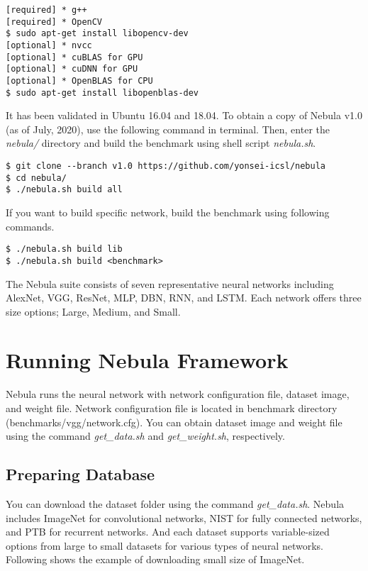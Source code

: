 \documentclass[10pt]{article}
\begin{document}
\begin{Verbatim}[frame=single,fontsize=\small]
[required] * g++
[required] * OpenCV
$ sudo apt-get install libopencv-dev
[optional] * nvcc
[optional] * cuBLAS for GPU 
[optional] * cuDNN for GPU
[optional] * OpenBLAS for CPU
$ sudo apt-get install libopenblas-dev
\end{Verbatim}

It has been validated in Ubuntu 16.04 and 18.04.
To obtain a copy of Nebula v1.0 (as of July, 2020), use the following command in terminal.
Then, enter the \emph{nebula/} directory and build the benchmark using shell script \emph{nebula.sh}.

\begin{Verbatim}[frame=single,fontsize=\small]
$ git clone --branch v1.0 https://github.com/yonsei-icsl/nebula
$ cd nebula/
$ ./nebula.sh build all
\end{Verbatim}

If you want to build specific network, build the benchmark using following commands.
\begin{Verbatim}[frame=single,fontsize=\small]
$ ./nebula.sh build lib
$ ./nebula.sh build <benchmark>
\end{Verbatim}
The Nebula suite consists of seven representative neural networks including AlexNet, VGG, ResNet, MLP, DBN, RNN, and LSTM.
Each network offers three size options; Large, Medium, and Small.

\section{Running Nebula Framework} \label{sec:running}

Nebula runs the neural network with network configuration file, dataset image, and weight file.
Network configuration file is located in benchmark directory (benchmarks/vgg/network.cfg).
You can obtain dataset image and weight file using the command \emph{get\_data.sh} and \emph{get\_weight.sh}, respectively.

\subsection{Preparing Database} \label{subsec:database}
You can download the dataset folder using the command \emph{get\_data.sh}.
Nebula includes ImageNet for convolutional networks, NIST for fully connected networks, and PTB for recurrent networks.
And each dataset supports variable-sized options from large to small datasets for various types of neural networks. 
Following shows the example of downloading small size of ImageNet.
\end{document}
